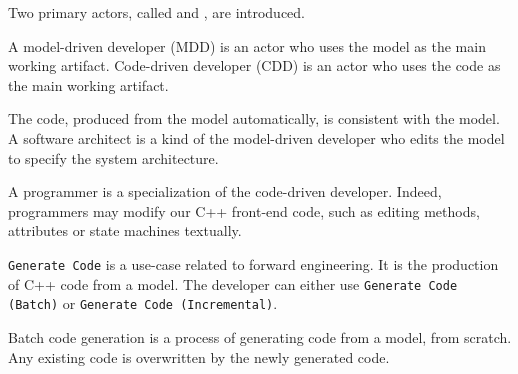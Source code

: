 Two primary actors, called 
and , are introduced.

\begin{definition}
	A model-driven developer (MDD) is an actor who uses the model as the main working artifact. Code-driven developer (CDD) is an actor who uses the code as the main working artifact.
\end{definition}

The code, produced from the model automatically, is consistent with the model.
A software architect is a kind of the model-driven developer
who edits the model to specify the system architecture.



A programmer is a specialization of the code-driven developer.
Indeed, programmers may modify our C++ front-end code, such as editing methods, attributes or state machines textually.



\texttt{Generate Code} is a use-case related to forward engineering.
It is the production of C++ code from a model.
The developer can either use \texttt{Generate Code (Batch)} or \texttt{Generate Code (Incremental)}.

\begin{definition}
	Batch code generation is a process of generating code
	from a model, from scratch.
	Any existing code is overwritten by the newly generated code.
\end{definition}

